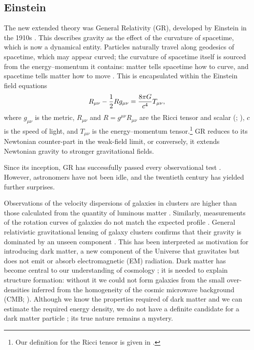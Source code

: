 \subsection{Einstein}

The new extended theory was General Relativity (GR), developed by Einstein in the 1910s \citep{Einstein1997}. This describes gravity as the effect of the curvature of spacetime, which is now a dynamical entity. Particles naturally travel along geodesics of spacetime, which may appear curved; the curvature of spacetime itself is sourced from the energy--momentum it contains: matter tells spacetime how to curve, and spacetime tells matter how to move \citep[section 1.1]{Misner1973}. This is encapsulated within the Einstein field equations \citep[documents 22, 25]{Einstein1997}
\begin{equation}
R_{\mu\nu} - \dfrac{1}{2}R g_{\mu\nu} = \dfrac{8\pi G}{c^4}T_{\mu\nu},
\end{equation}
where $g_{\mu\nu}$ is the metric, $R_{\mu\nu}$ and $R = g^{\mu\nu}R_{\mu\nu}$ are the Ricci tensor and scalar (\citealt[section 8.7]{Misner1973}; \citealt[section 3.2]{Wald1984}), $c$ is the speed of light, and $T_{\mu\nu}$ is the energy--momentum tensor.\footnote{Our definition for the Ricci tensor is given in .} GR reduces to its Newtonian counter-part in the weak-field limit, or conversely, it extends Newtonian gravity to stronger gravitational fields.

Since its inception, GR has successfully passed every observational test \citep{Will1993, Will2006}. However, astronomers have not been idle, and the twentieth century has yielded further surprises.

Observations of the velocity dispersions of galaxies in clusters are higher than those calculated from the quantity of luminous matter \citep[e.g.,][]{Zwicky1937}. Similarly, measurements of the rotation curves of galaxies do not match the expected profile \citep{Babcock1939}. General relativistic gravitational lensing of galaxy clusters confirms that their gravity is dominated by an unseen component \citep{Bergmann1990,Clowe2006}. This has been interpreted as motivation for introducing dark matter, a new component of the Universe that gravitates but does not emit or absorb electromagnetic (EM) radiation. Dark matter has become central to our understanding of cosmology \citep[e.g.,][]{Springel2006a}; it is needed to explain structure formation: without it we could not form galaxies from the small over-densities inferred from the homogeneity of the cosmic microwave background (CMB; \citealt{White1978,Liddle1993}). Although we know the properties required of dark matter and we can estimate the required energy density, we do not have a definite candidate for a dark matter particle \citep{Bertone2005}; its true nature remains a mystery.

